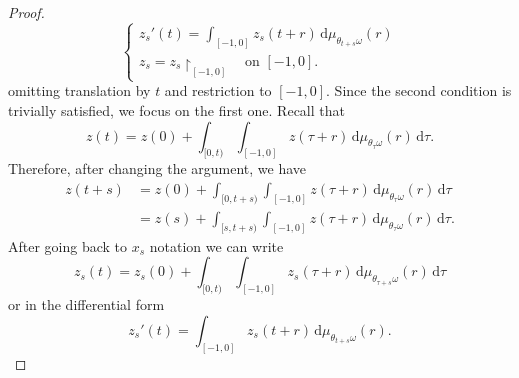 \documentclass[reqno]{amsart}
\theoremstyle{plain}
\numberwithin{equation}{section}
\numberwithin{definition}{section}
\newcommand{\dd}{\ensuremath{\mathrm{d}}}
\begin{document}
{\begin{proof}
\begin{equation*}
\begin{cases}
 z_s'(t) = \displaystyle \int_{[-1,0]} z_s(t + r) \, \dd\mu_{\theta_{t+s}\omega}(r) \\
z_s = z_s{\restriction}_{[-1,0]} \quad \text{on } [-1,0]. 
\end{cases}
\end{equation*}
omitting translation by $t$ and restriction to $[-1,0]$. Since the second condition is trivially satisfied, we focus on the first one. Recall that 
\begin{equation*}
z(t) = z(0) + \int_{[0,t)} \int_{[-1,0]} z(\tau+r) \, \dd\mu_{\theta_\tau\omega}(r) \, \dd \tau.
\end{equation*}
Therefore, after changing the argument, we have 
\begin{equation*}
\begin{split}
    z(t+s) & = z(0) + \int_{[0,t+s)} \int_{[-1,0]} z(\tau+r) \, \dd\mu_{\theta_\tau\omega}(r) \, \dd \tau \\
& = z(s) + \int_{[s,t+s)} \int_{[-1,0]} z(\tau+r) \, \dd\mu_{\theta_\tau\omega}(r) \, \dd \tau.
\end{split}
\end{equation*}
After going back to $x_s$ notation we can write  
\begin{equation*}
z_s(t) = z_s(0) + \int_{[0,t)} \int_{[-1,0]} z_s(\tau+r) \, \dd\mu_{\theta_{\tau+s}\omega}(r) \, \dd \tau
\end{equation*}
or in the differential form 
\begin{equation*}
z_s'(t) = \int_{[-1,0]} z_s(t+r) \, \dd\mu_{\theta_{t+s}\omega}(r). 
\end{equation*}
\end{proof}

}
\end{document}
